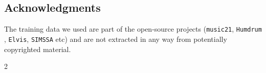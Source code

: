 \documentclass{article}
\begin{document}
\begin{multicols}{2}
    \section{Acknowledgments}
    The training data we used are part of the open-source projects (\texttt{music21}, \texttt{Humdrum} \cite{humdrum}, \texttt{Elvis}, \texttt{SIMSSA} \cite{simssa} etc) and are not extracted in any way from potentially copyrighted material.
    
    \printbibliography
    
\end{multicols}{2}
\end{document}
